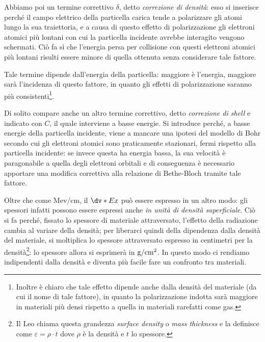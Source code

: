 Abbiamo poi un termine correttivo $\delta$, detto \textit{correzione di densità}: esso si inserisce perché il campo elettrico della particella carica tende a polarizzare gli atomi lungo la sua traiettoria, e a causa di questo effetto di polarizzazione gli elettroni atomici più lontani con cui la particella incidente avrebbe interagito vengono schermati. Ciò fa sì che l'energia persa per collisione con questi elettroni atomici più lontani risulti essere minore di quella ottenuta senza considerare tale fattore. 

Tale termine dipende dall'energia della particella: maggiore è l'energia, maggiore sarà l'incidenza di questo fattore, in quanto gli effetti di polarizzazione saranno più consistenti\footnote{Inoltre è chiaro che tale effetto dipende anche dalla densità del materiale (da cui il nome di tale fattore), in quanto la polarizzazione indotta sarà maggiore in materiali più densi rispetto a quella in materiali rarefatti come gas.}.

Di solito compare anche un altro termine correttivo, detto \textit{correzione di shell} e indicato con $C$, il quale interviene a basse energie. Si introduce perché, a basse energie della particella incidente, viene a mancare una ipotesi del modello di Bohr secondo cui gli elettroni atomici sono praticamente stazionari, fermi rispetto alla particella incidente: se invece questa ha energia bassa, la sua velocità è paragonabile a quella degli elettroni orbitali e di conseguenza è necessario apportare una modifica correttiva alla relazione di Bethe-Bloch tramite tale fattore.

\vspace{0.2cm}Oltre che come Mev/cm, il $\dv*{E}{x}$ può essere espresso in un altro modo: gli spessori infatti possono essere espressi anche \textit{in unità di densità superficiale}. Ciò si fa perché, fissato lo spessore di materiale attraversato, l'effetto della radiazione cambia al variare della densità; per liberarci quindi della dipendenza dalla densità del materiale, si moltiplica lo spessore attraversato espresso in centimetri per la densità\footnote{Il Leo chiama questa grandezza \textit{surface density} o \textit{mass thickness} e la definisce come $\varepsilon=\rho \cdot t$ dove $\rho$ è la densità e $t$ lo spessore.}: lo spessore allora si esprimerà in $\rm g/cm^2$. In questo modo ci rendiamo indipendenti dalla densità e diventa più facile fare un confronto tra materiali.

